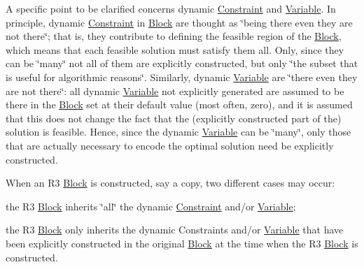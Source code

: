 A specific point to be clarified concerns dynamic \mbox{\hyperlink{class_s_m_spp__di__unipi__it_1_1_constraint}{Constraint}} and \mbox{\hyperlink{class_s_m_spp__di__unipi__it_1_1_variable}{Variable}}. In principle, dynamic \mbox{\hyperlink{class_s_m_spp__di__unipi__it_1_1_constraint}{Constraint}} in \mbox{\hyperlink{class_s_m_spp__di__unipi__it_1_1_block}{Block}} are thought as \char`\"{}being
there even they are not there\char`\"{}; that is, they contribute to defining the feasible region of the \mbox{\hyperlink{class_s_m_spp__di__unipi__it_1_1_block}{Block}}, which means that each feasible solution must satisfy them all. Only, since they can be \char`\"{}many\char`\"{} not all of them are explicitly constructed, but only \char`\"{}the subset that is useful for
algorithmic reasons\char`\"{}. Similarly, dynamic \mbox{\hyperlink{class_s_m_spp__di__unipi__it_1_1_variable}{Variable}} are \char`\"{}there even they are
not there\char`\"{}\+: all dynamic \mbox{\hyperlink{class_s_m_spp__di__unipi__it_1_1_variable}{Variable}} not explicitly generated are assumed to be there in the \mbox{\hyperlink{class_s_m_spp__di__unipi__it_1_1_block}{Block}} set at their default value (most often, zero), and it is assumed that this does not change the fact that the (explicitly constructed part of the) solution is feasible. Hence, since the dynamic \mbox{\hyperlink{class_s_m_spp__di__unipi__it_1_1_variable}{Variable}} can be \char`\"{}many\char`\"{}, only those that are actually necessary to encode the optimal solution need be explicitly constructed.

When an R3 \mbox{\hyperlink{class_s_m_spp__di__unipi__it_1_1_block}{Block}} is constructed, say a copy, two different cases may occur\+:


\begin{DoxyItemize}
\item the R3 \mbox{\hyperlink{class_s_m_spp__di__unipi__it_1_1_block}{Block}} inherits \char`\"{}all\char`\"{} the dynamic \mbox{\hyperlink{class_s_m_spp__di__unipi__it_1_1_constraint}{Constraint}} and/or \mbox{\hyperlink{class_s_m_spp__di__unipi__it_1_1_variable}{Variable}};
\item the R3 \mbox{\hyperlink{class_s_m_spp__di__unipi__it_1_1_block}{Block}} only inherits the dynamic Constraints and/or \mbox{\hyperlink{class_s_m_spp__di__unipi__it_1_1_variable}{Variable}} that have been explicitly constructed in the original \mbox{\hyperlink{class_s_m_spp__di__unipi__it_1_1_block}{Block}} at the time when the R3 \mbox{\hyperlink{class_s_m_spp__di__unipi__it_1_1_block}{Block}} is constructed.
\end{DoxyItemize}

